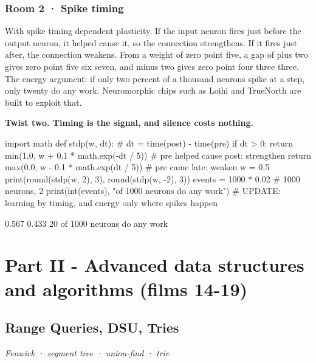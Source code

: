 \documentclass[11pt,a4paper]{report}
\begin{document}
\section*{Room 2 · Spike timing}
With spike timing dependent plasticity. If the input neuron fires just before the output neuron, it helped cause it, so the connection strengthens. If it fires just after, the connection weakens. From a weight of zero point five, a gap of plus two gives zero point five six seven, and minus two gives zero point four three three. The energy argument: if only two percent of a thousand neurons spike at a step, only twenty do any work. Neuromorphic chips such as Loihi and TrueNorth are built to exploit that.
\begin{tcolorbox}[colback=yellow!12,colframe=orange!70!black,boxrule=0.4pt,left=4pt,right=4pt,top=2pt,bottom=2pt]\textbf{Twist two. Timing is the signal, and silence costs nothing.}\end{tcolorbox}
\begin{Code}
import math
def stdp(w, dt):                            # dt = time(post) - time(pre)
    if dt > 0: return min(1.0, w + 0.1 * math.exp(-dt / 5))   # pre helped cause post: strengthen
    return max(0.0, w - 0.1 * math.exp(dt / 5))               # pre came late: weaken
w = 0.5
print(round(stdp(w, 2), 3), round(stdp(w, -2), 3))
events = 1000 * 0.02                        # 1000 neurons, 2%
print(int(events), "of 1000 neurons do any work")
# UPDATE: learning by timing, and energy only where spikes happen
\end{Code}
\begin{Out}
0.567 0.433
20 of 1000 neurons do any work
\end{Out}
\part*{Part II - Advanced data structures and algorithms (films 14-19)}
\chapter{Range Queries, DSU, Tries}
\textit{Fenwick · segment tree · union-find · trie}
\end{document}
